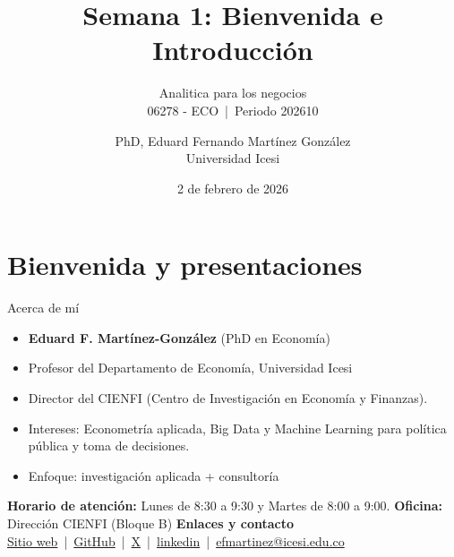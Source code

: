 \documentclass[10pt, xcolor=dvipsnames]{beamer}
\title{\textbf{Semana 1: Bienvenida e Introducción}}
\subtitle{\LARGE{Analitica para los negocios} \\ \vspace{0.2cm}
          \large{06278 - ECO \,|\, Periodo 202610}}
\author[]{PhD, Eduard Fernando Martínez González \\ \vspace{0.2cm}
          \normalsize{Universidad Icesi}}
\date{2 de febrero de 2026}
\begin{document}
 
\begin{frame}
\titlepage
\end{frame}

\section{Bienvenida y presentaciones}

\begin{frame}{Acerca de mí}
\begin{itemize}
  \item \textbf{Eduard F. Martínez-González} (PhD en Economía)
  \item Profesor del Departamento de Economía, Universidad Icesi
  \item Director del CIENFI (Centro de Investigación en Economía y Finanzas).
  \item Intereses: Econometría aplicada,  Big Data y Machine Learning para política pública y toma de decisiones.
  \item Enfoque: investigación aplicada + consultoría
\end{itemize}
\vspace{0.2cm}
\textbf{Horario de atención:} Lunes de 8:30 a 9:30 y Martes de 8:00 a 9:00.
\vspace{0.2cm}
\textbf{Oficina:} Dirección CIENFI (Bloque B)
\vspace{0.2cm}
\textbf{Enlaces y contacto} \\ \vspace{0.1cm}
\href{https://eduard-martinez.github.io/}{Sitio web} \,|\, 
\href{https://github.com/eduard-martinez}{GitHub} \,|\, 
\href{https://x.com/emartigo}{X} \,|\, 
\href{https://www.linkedin.com/in/eduard-fernando-mart\%C3\%ADnez-gonz\%C3\%A1lez-b99937117/}{linkedin} \,|\, 
\href{mailto:efmartinez@icesi.edu.co}{efmartinez@icesi.edu.co}
\end{frame}
\end{document}
